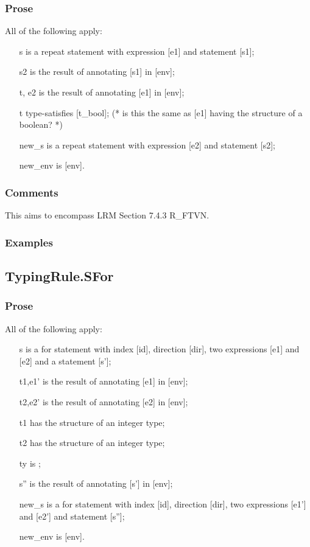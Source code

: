\documentclass{book}
\begin{document}
    \subsubsection{Prose}
    All of the following apply:
   \begin{itemize}
   \item [s] is a repeat statement with expression [e1] and statement [s1];
   \item [s2] is the result of annotating [s1] in [env];
   \item [t, e2] is the result of annotating [e1] in [env];
   \item [t] type-satisfies [t\_bool]; (* is this the same as [e1] having the structure of a boolean? *)
   \item [new\_s] is a repeat statement with expression [e2] and statement [s2];
   \item [new\_env] is [env].
   \end{itemize}

    \subsubsection{Comments}
    This aims to encompass LRM Section 7.4.3 R\_FTVN.

    \subsubsection{Examples}

\subsection{TypingRule.SFor}

    \subsubsection{Prose}
    All of the following apply:
   \begin{itemize}
   \item [s] is a for statement with index [id], direction [dir], two expressions
      [e1] and [e2] and a statement [s'];
   \item [t1,e1'] is the result of annotating [e1] in [env];
   \item [t2,e2'] is the result of annotating [e2] in [env];
   \item [t1] has the structure of an integer type;
   \item [t2] has the structure of an integer type;
   \item [ty] is ;
   \item [s''] is the result of annotating [s'] in [env];
   \item [new\_s] is a for statement with index [id], direction [dir], two expressions
      [e1'] and [e2'] and statement [s''];
   \item [new\_env] is [env].
   \end{itemize}
\end{document}

